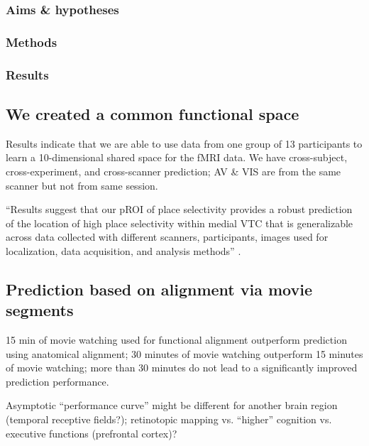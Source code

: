 \subsubsection{Aims \& hypotheses}



\subsubsection{Methods}



\subsubsection{Results}




\subsection{We created a common functional space}

%
Results indicate that we are able to use data from one group of 13 participants
to learn a 10-dimensional shared space for the fMRI data.
%
We have cross-subject, cross-experiment, and cross-scanner prediction; AV \& VIS
are from the same scanner but not from same session.

%
``Results suggest that our pROI of place selectivity provides a robust
prediction of the location of high place selectivity within medial VTC that is
generalizable across data collected with different scanners, participants,
images used for localization, data acquisition, and analysis methods''
\citep{weiner2018defining}.



\subsection{Prediction based on alignment via movie segments}

%
15 min of movie watching used for functional alignment outperform prediction
using anatomical alignment;
%
30 minutes of movie watching outperform 15 minutes of movie watching;
%
more than 30 minutes do not lead to a significantly improved prediction
performance.

%
Asymptotic ``performance curve'' might be different for another brain region
(temporal receptive fields?); retinotopic mapping vs. ``higher'' cognition  vs.
executive functions (prefrontal cortex)?


